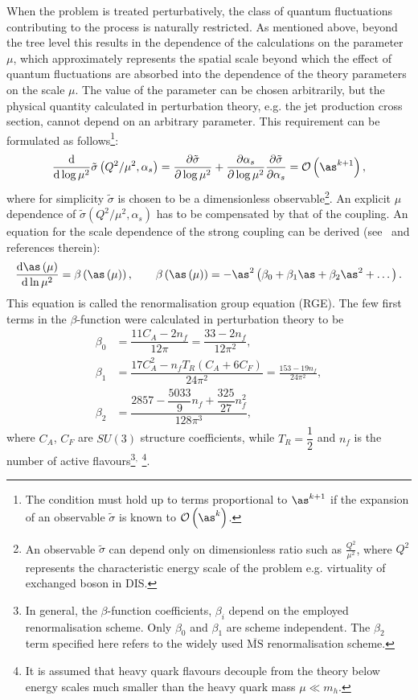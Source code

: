 When the problem is treated perturbatively, the class of quantum fluctuations contributing to the process is naturally restricted. As mentioned above, beyond the tree level this results in the dependence of the calculations on the parameter $\mu$, which approximately represents the spatial scale beyond which the effect of quantum fluctuations are absorbed into the dependence of the theory parameters on the scale $\mu$. The value of the parameter can be chosen arbitrarily, but the physical quantity calculated in perturbation theory, e.g. the jet production cross section, cannot depend on an arbitrary parameter. This requirement can be formulated as follows\footnote{The condition must hold up to terms proportional to $\as^{k+1}$ if the expansion of an observable $\tilde{\sigma}$ is known to $\mathcal{O}\left(\as^{k}\right)$.}:
\begin{equation}
 \frac{\mathrm{d}}{\mathrm{d}\log{\mu^2}} \tilde{\sigma} \left( Q^2/\mu^2, \alpha_s \right) = \frac{\partial \tilde{\sigma} }{\partial \log{\mu^2}} + \frac{\partial \alpha_s }{\partial \log{\mu^2}}\frac{\partial \tilde{\sigma} }{\partial \alpha_s} = \mathcal{O}\left(\as^{k+1}\right),
\end{equation}
where for simplicity $\tilde{\sigma}$ is chosen to be a dimensionless observable\footnote{An observable $\tilde{\sigma}$ can depend only on dimensionless ratio such as $\frac{Q^2}{\mu^2}$, where $Q^2$ represents the characteristic energy scale of the problem e.g. virtuality of exchanged boson in DIS.}. An explicit $\mu$ dependence of $\tilde{\sigma} \left( Q^2/\mu^2, \alpha_s \right)$ has to be compensated by that of the coupling. An equation for the scale dependence of the strong coupling can be derived (see~\cite{QCDrge:2014} and references therein):
 \begin{equation}
   \frac{\mathrm{d}\as\left(\mu\right)}{\mathrm{d}\ln{\mu^2}} = \beta\left(\as\left(\mu\right)\right),\qquad \beta\left(\as\left(\mu\right)\right) = -\as^2\left(\beta_0 + \beta_1\as + \beta_2\as^2 + \dots \right).
 \label{eq:asrunnig}
 \end{equation}
This equation is called the renormalisation group equation (RGE). The few first terms in the $\beta$-function were calculated in perturbation theory to be
\begin{align}
	\beta_0 &= \dfrac{11C_A-2n_f}{12\pi} = \dfrac{33 - 2n_f}{12\pi^2},\\
	\beta_1 &= \dfrac{17C_A^2-n_fT_R\left(C_A+6C_F\right)}{24\pi^2} = \frac{153-19n_f}{24\pi^2},\\
	\beta_2 &= \dfrac{2857-\dfrac{5033}{9}n_f+\dfrac{325}{27}n_f^2}{128\pi^3},
\end{align}
where $C_A$, $C_F$ are $SU\left(3\right)$ structure coefficients, while $T_R=\dfrac{1}{2}$ and $n_f$ is the number of active flavours\footnote{In general, the $\beta$-function coefficients, $\beta_i$ depend on the employed renormalisation scheme. Only $\beta_0$ and $\beta_1$ are scheme independent. The $\beta_2$ term specified here refers to the widely used $\overline{\mathrm{MS}}$ renormalisation scheme.}$^,$
\footnote{It is assumed that heavy quark flavours decouple from the theory below energy scales much smaller than the heavy quark mass $\mu \ll m_h$.}. 

